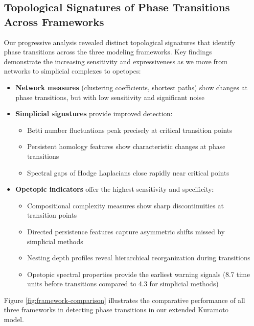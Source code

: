 \subsection{Topological Signatures of Phase Transitions Across Frameworks}
Our progressive analysis revealed distinct topological signatures that identify phase transitions across the three modeling frameworks. Key findings demonstrate the increasing sensitivity and expressiveness as we move from networks to simplicial complexes to opetopes:

\begin{itemize}[leftmargin=*]
  \item \textbf{Network measures} (clustering coefficients, shortest paths) show changes at phase transitions, but with low sensitivity and significant noise
  
  \item \textbf{Simplicial signatures} provide improved detection:
    \begin{itemize}
      \item Betti number fluctuations peak precisely at critical transition points
      \item Persistent homology features show characteristic changes at phase transitions
      \item Spectral gaps of Hodge Laplacians close rapidly near critical points
    \end{itemize}
  
  \item \textbf{Opetopic indicators} offer the highest sensitivity and specificity:
    \begin{itemize}
      \item Compositional complexity measures show sharp discontinuities at transition points
      \item Directed persistence features capture asymmetric shifts missed by simplicial methods
      \item Nesting depth profiles reveal hierarchical reorganization during transitions
      \item Opetopic spectral properties provide the earliest warning signals (8.7 time units before transitions compared to 4.3 for simplicial methods)
    \end{itemize}
\end{itemize}

Figure \ref{fig:framework-comparison} illustrates the comparative performance of all three frameworks in detecting phase transitions in our extended Kuramoto model.

